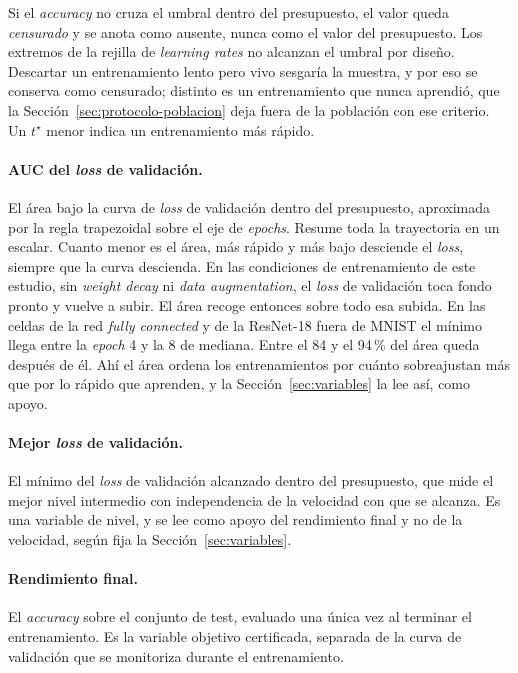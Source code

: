 Si el \emph{accuracy} no cruza el umbral dentro del presupuesto, el valor queda \emph{censurado} y se anota como ausente, nunca como el valor del presupuesto. Los extremos de la rejilla de \emph{learning rates} no alcanzan el umbral por diseño. Descartar un entrenamiento lento pero vivo sesgaría la muestra, y por eso se conserva como censurado; distinto es un entrenamiento que nunca aprendió, que la Sección~\ref{sec:protocolo-poblacion} deja fuera de la población con ese criterio. Un $t^\star$ menor indica un entrenamiento más rápido.

\paragraph{AUC del \emph{loss} de validación.} El área bajo la curva de \emph{loss} de validación
dentro del presupuesto, aproximada por la regla trapezoidal sobre el eje de \emph{epochs}. Resume toda la trayectoria en un escalar. Cuanto menor es el área, más rápido y más bajo desciende el \emph{loss}, siempre que la curva descienda. En las condiciones de entrenamiento de este estudio, sin \emph{weight decay} ni \emph{data augmentation}, el \emph{loss} de validación toca fondo pronto y vuelve a subir. El área recoge entonces sobre todo esa subida. En las celdas de la red \emph{fully connected} y de la ResNet-18 fuera de MNIST el mínimo llega entre la \emph{epoch} 4 y la 8 de mediana. Entre el 84 y el 94\,\% del área queda después de él. Ahí el área ordena los entrenamientos por cuánto sobreajustan más que por lo rápido que aprenden, y la Sección~\ref{sec:variables} la lee así, como apoyo.

\paragraph{Mejor \emph{loss} de validación.} El mínimo del \emph{loss} de validación alcanzado
dentro del presupuesto, que mide el mejor nivel intermedio con independencia de la velocidad con que se alcanza. Es una variable de nivel, y se lee como apoyo del rendimiento final y no de la velocidad, según fija la Sección~\ref{sec:variables}.

\paragraph{Rendimiento final.} El \emph{accuracy} sobre el conjunto de test, evaluado una única
vez al terminar el entrenamiento. Es la variable objetivo certificada, separada de la curva de validación que se monitoriza durante el entrenamiento.

